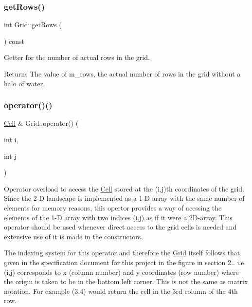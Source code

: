 \subsubsection{\texorpdfstring{get\+Rows()}{getRows()}}
{\footnotesize\ttfamily int Grid\+::get\+Rows (\begin{DoxyParamCaption}{ }\end{DoxyParamCaption}) const}



Getter for the number of actual rows in the grid. 

\begin{DoxyReturn}{Returns}
The value of m\+\_\+rows, the actual number of rows in the grid without a halo of water. 
\end{DoxyReturn}
\mbox{\label{class_grid_aed06be122077b3a0c1fe7c412c2535fc}} 
\subsubsection{\texorpdfstring{operator()()}{operator()()}\hspace{0.1cm}{\footnotesize\ttfamily [1/2]}}
{\footnotesize\ttfamily \hyperlink{class_cell}{Cell} \& Grid\+::operator() (\begin{DoxyParamCaption}\item[{int}]{i,  }\item[{int}]{j }\end{DoxyParamCaption})}



Operator overload to access the \hyperlink{class_cell}{Cell} stored at the (i,j)th coordinates of the grid. Since the 2-\/D landscape is implemented as a 1-\/D array with the same number of elements for memory reasons, this opertor provides a way of acessing the elements of the 1-\/D array with two indices (i,j) as if it were a 2\+D-\/array. This operator should be used whenever direct access to the grid cells is needed and extensive use of it is made in the constructors. 

The indexing system for this operator and therefore the \hyperlink{class_grid}{Grid} itself follows that given in the specification document for this project in the figure in section 2.. i.\+e. (i,j) corresponds to x (column number) and y coordinates (row number) where the origin is taken to be in the bottom left corner. This is not the same as matrix notation. For example (3,4) would return the cell in the 3rd column of the 4th row.


